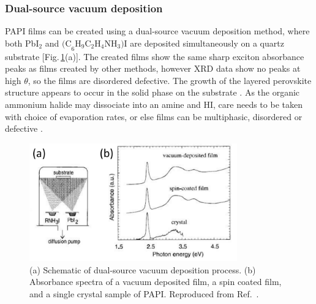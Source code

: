 \subsubsection{Dual-source vacuum deposition}
PAPI films can be created using a dual-source vacuum deposition method, where both Pb$\textrm{I}_2$ and $\textrm{(C}_6\textrm{H}_9\textrm{C}_2\textrm{H}_4\textrm{NH}_3)\textrm{I}$ are deposited simultaneously on a quartz substrate [Fig.\,\ref{2Fig8}(a)]. The created films show the same sharp exciton absorbance peaks as films created by other methods, however XRD data show no peaks at high $\theta$, so the films are disordered defective. The growth of the layered perovskite structure appears to occur in the solid phase on the substrate \cite{Era1997}. As the organic ammonium halide may dissociate into an amine and HI, care needs to be taken with choice of evaporation rates, or else films can be multiphasic, disordered or defective \cite{Mitzi1999}.
\begin{figure}[h!]
\centering
\includegraphics[width=0.8\textwidth]{Fig8}
\caption{(a) Schematic of dual-source vacuum deposition process. (b) Absorbance spectra of a vacuum deposited film, a spin coated film, and a single crystal sample of PAPI. Reproduced from Ref.\ \cite{Era1997}.}
\label{2Fig8}
\end{figure}

